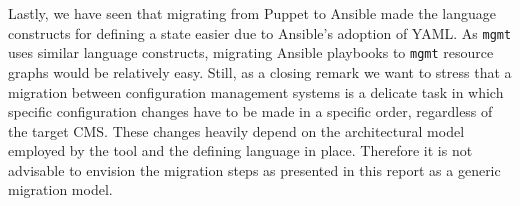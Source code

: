 Lastly, we have seen that migrating from Puppet to Ansible made the language constructs for defining a state easier due to Ansible's adoption of YAML. As \texttt{mgmt} uses similar language constructs, migrating Ansible playbooks to \texttt{mgmt} resource graphs would be relatively easy. Still, as a closing remark we want to stress that a migration between configuration management systems is a delicate task in which specific configuration changes have to be made in a specific order, regardless of the target CMS. These changes  heavily depend on the architectural model employed by the tool and the defining language in place. Therefore it is not advisable to envision the migration steps as presented in this report as a generic migration model. 